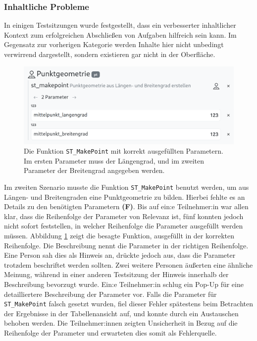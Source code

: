 \subsubsection{Inhaltliche Probleme}
In einigen Testsitzungen wurde festgestellt, dass ein verbesserter inhaltlicher Kontext zum erfolgreichen Abschließen von Aufgaben hilfreich sein kann. Im Gegensatz zur vorherigen Kategorie werden Inhalte hier nicht unbedingt verwirrend dargestellt, sondern existieren gar nicht in der Oberfläche.

\begin{figure}[!ht]
  \centering
  \includegraphics[width=.9\textwidth]{assets/st-makepoint.png}
  \caption{Die Funktion \texttt{ST\_MakePoint} mit korrekt ausgefüllten Parametern. Im ersten Parameter muss der Längengrad, und im zweiten Parameter der Breitengrad angegeben werden.}
  \label{fig:parameters}
\end{figure}
Im zweiten Szenario musste die Funktion \texttt{ST\_MakePoint} benutzt werden, um aus Längen- und Breitengraden eine Punktgeometrie zu bilden. Hierbei fehlte es an Details zu den benötigten Parametern \textbf{(F)}. Bis auf ein:e Teilnehmer:in war allen klar, dass die Reihenfolge der Parameter von Relevanz ist, fünf konnten jedoch nicht sofort feststellen, in welcher Reihenfolge die Parameter ausgefüllt werden müssen. Abbildung \ref{fig:parameters} zeigt die besagte Funktion, ausgefüllt in der korrekten Reihenfolge. Die Beschreibung nennt die Parameter in der richtigen Reihenfolge. Eine Person sah dies als Hinweis an, drückte jedoch aus, dass die Parameter trotzdem beschriftet werden sollten. Zwei weitere Personen äußerten eine ähnliche Meinung, während in einer anderen Testsitzung der Hinweis innerhalb der Beschreibung bevorzugt wurde. Ein:e Teilnehmer:in schlug ein Pop-Up für eine detailliertere Beschreibung der Parameter vor. Falls die Parameter für \texttt{ST\_MakePoint} falsch gesetzt wurden, fiel dieser Fehler spätestens beim Betrachten der Ergebnisse in der Tabellenansicht auf, und konnte durch ein Austauschen behoben werden. Die Teilnehmer:innen zeigten Unsicherheit in Bezug auf die Reihenfolge der Parameter und erwarteten dies somit als Fehlerquelle.

